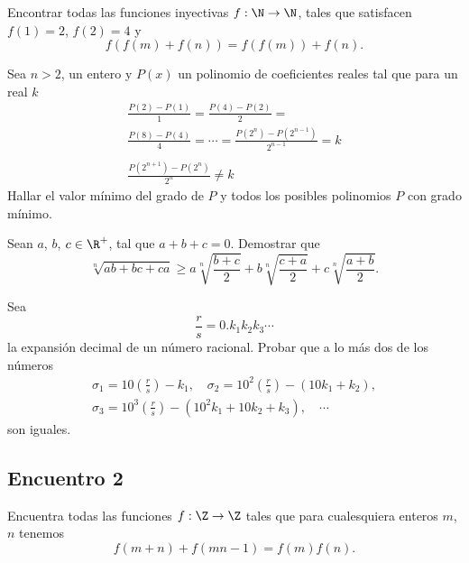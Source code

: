 \begin{section-problem}
    Encontrar todas las funciones inyectivas $f: \N \rightarrow \N$, tales que satisfacen $f(1) = 2$, $f(2) = 4$ y
    \[f(f(m) + f(n)) =  f(f(m)) + f(n).\]
\end{section-problem}

\begin{section-problem}
    Sea $n > 2$, un entero y $P(x)$ un polinomio de coeficientes reales tal que para un real $k$
    \begin{gather*}
        \frac{P(2) - P(1)}{1} = \frac{P(4) - P(2)}{2} =\\
        \frac{P(8) - P(4)}{4} = \cdots = \frac{P(2^n) - P(2^{n - 1})}{2^{n - 1}} = k \\
        \\
        \frac{P(2^{n + 1}) - P(2^n)}{2^n} \neq k
    \end{gather*}
    Hallar el valor mínimo del grado de $P$ y todos los posibles polinomios $P$ con grado mínimo.
\end{section-problem}

\begin{section-problem}
    Sean $a$, $b$, $c \in \R^+$, tal que $a + b + c = 0$.
    Demostrar que
    \[\sqrt[n]{ab + bc + ca} \geq a \sqrt[n]{\frac{b + c}{2}} + b \sqrt[n]{\frac{c + a}{2}} + c \sqrt[n]{\frac{a + b}{2}}.\]
\end{section-problem}

\begin{section-problem}
    Sea
    \[\frac{r}{s} = 0. k_1 k_2 k_3 \cdots\]
    la expansión decimal de un número racional.
    Probar que a lo más dos de los números
    \begin{gather*}
        \sigma_1 = 10 \left(\frac{r}{s}\right) - k_1, \quad
        \sigma_2 = 10^2 \left(\frac{r}{s}\right) - (10 k_1 + k_2),\\
        \sigma_3 = 10^3 \left(\frac{r}{s}\right) - (10^2 k_1 + 10 k_2 + k_3), \quad \cdots
    \end{gather*}
    son iguales.

\end{section-problem}


\subsection{Encuentro 2}

\begin{section-problem}
    Encuentra todas las funciones $f: \Z \rightarrow \Z$ tales que para cualesquiera enteros $m$, $n$ tenemos
    \[f(m + n) + f(mn - 1) = f(m)f(n).\]
\end{section-problem}


